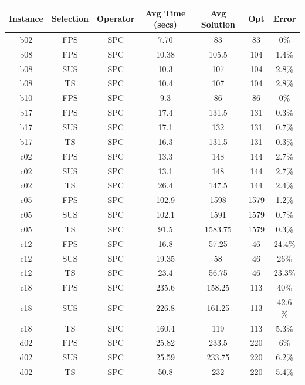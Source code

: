 \documentclass[10pt]{article}
\begin{document}
	\begin{table}[h!]
		\centering
		\begin{tabular}{|c|c|c|c|c|c|c|}
		\hline
\textbf{Instance} & \textbf{Selection} & \textbf{Operator} & \textbf{Avg Time (secs)} & \textbf{Avg Solution} & \textbf{Opt} & \textbf{Error} \\
\hline
\rowcolor{yellow!60} b02 & FPS & SPC & 7.70 & 83 & 83 & 0\% \\
\hline
\rowcolor{yellow!60} b08 & FPS & SPC & 10.38 & 105.5 & 104 & 1.4\% \\
b08 & SUS & SPC & 10.3 & 107 & 104 & 2.8\% \\
b08 & TS  & SPC & 10.4 & 107 & 104 & 2.8\% \\
\hline
\rowcolor{yellow!60} b10 & FPS & SPC & 9.3 & 86 & 86 & 0\% \\
\hline
\rowcolor{yellow!60} b17 & FPS & SPC & 17.4 & 131.5 & 131 & 0.3\% \\
b17 & SUS & SPC & 17.1 & 132 & 131 & 0.7\% \\
\rowcolor{yellow!60} b17 & TS  & SPC & 16.3 & 131.5 & 131 & 0.3\% \\
\hline
c02 & FPS & SPC & 13.3 & 148 & 144 & 2.7\% \\
c02 & SUS & SPC & 13.1 & 148 & 144 & 2.7\% \\
\rowcolor{yellow!60} c02 & TS  & SPC & 26.4 & 147.5 & 144 & 2.4\% \\
\hline
c05 & FPS & SPC & 102.9 & 1598 & 1579 & 1.2\% \\
c05 & SUS & SPC & 102.1 & 1591 & 1579 & 0.7\% \\
\rowcolor{yellow!60} c05 & TS & SPC & 91.5 & 1583.75 & 1579 & 0.3\% \\
\hline
c12 & FPS & SPC & 16.8 & 57.25 & 46 & 24.4\% \\
c12 & SUS & SPC & 19.35 & 58 & 46 & 26\% \\
\rowcolor{yellow!60} c12 & TS & SPC & 23.4 & 56.75 & 46 & 23.3\% \\
\hline
c18 & FPS & SPC & 235.6 & 158.25 & 113 & 40\% \\
c18 & SUS & SPC & 226.8 & 161.25 & 113 & 42.6 \% \\
\rowcolor{yellow!60} c18 & TS & SPC & 160.4 & 119 & 113 & 5.3\% \\
\hline
d02 & FPS & SPC & 25.82 & 233.5 & 220 & 6\% \\
d02 & SUS & SPC & 25.59 & 233.75 & 220 & 6.2\% \\
\rowcolor{yellow!60} d02 & TS & SPC & 50.8 & 232 & 220 & 5.4\% \\

\end{tabular}
\end{table}
\end{document}
